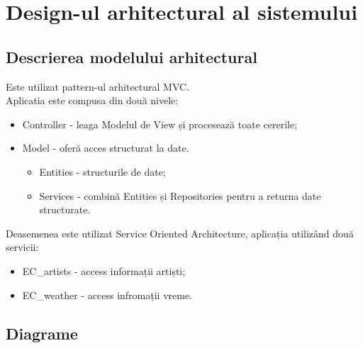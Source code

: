 \documentclass[11pt,a4paper,twoside,notitlepage]{article}
\begin{document}
\section{Design-ul arhitectural al sistemului}

\subsection{Descrierea modelului arhitectural}
Este utilizat pattern-ul arhitectural MVC.\\
Aplicatia este compusa din două nivele: 
\begin{itemize}
	\item Controller - leaga Modelul de View și procesează toate cererile;
	\item Model - oferă acces structurat la date. 
																	\begin{itemize}
																		\item Entities - structurile de date;
															
		\item Services - combină Entities și Repositories pentru a returna date structurate.
																	\end{itemize}
\end{itemize}

Deasemenea este utilizat Service Oriented Architecture, aplicația utiliz\^{a}nd două servicii:
\begin{itemize}
	\item EC\_artists - access informații artiști;
	\item EC\_weather - access infromații vreme.
\end{itemize}


\subsection{Diagrame}
\end{document}

